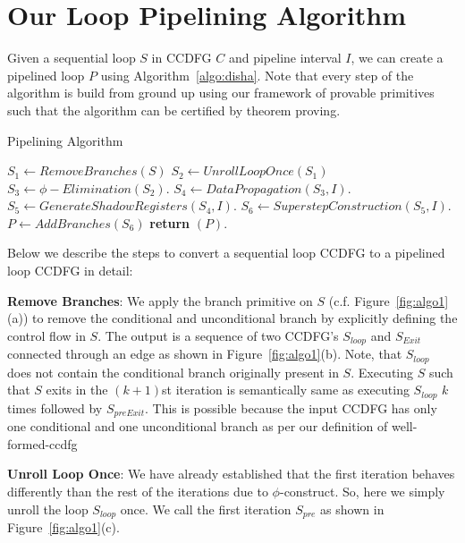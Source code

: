\section{Our Loop Pipelining Algorithm}
Given a sequential loop $S$ in CCDFG $C$ and pipeline interval $I$, we can create a pipelined loop $P$ using Algorithm~\ref{algo:disha}. Note that every step of the algorithm is build from ground up using our framework of provable primitives such that the algorithm can be certified by theorem proving.

\begin{algorithm2e}
\caption{Pipelining Algorithm}
\label{algo:loop}
\begin{algorithmic}[1]
\State $S_1 \leftarrow RemoveBranches(S)$
\State $S_2 \leftarrow UnrollLoopOnce(S_1)$
\State $S_3 \leftarrow \phi-Elimination (S_2) $.
\State $S_4 \leftarrow DataPropagation (S_3, I) $.
\State $S_5 \leftarrow GenerateShadowRegisters (S_4, I) $.
\State $ S_6 \leftarrow SuperstepConstruction (S_5, I) $.
\State $P \leftarrow AddBranches (S_6) $
\State \textbf{return} $(P)$.
\EndProcedure
\end{algorithmic}
\end{algorithm2e}

Below we describe the steps to convert a sequential loop CCDFG to a pipelined loop CCDFG in detail:
 
{\bf Remove Branches}: We apply the branch primitive on $S$ (c.f. Figure~\ref{fig:algo1}(a)) to remove the conditional and unconditional branch by explicitly defining the control flow in $S$. The output is a sequence of two CCDFG's $S_{loop}$ and $S_{Exit}$ connected through an edge as shown in Figure~\ref{fig:algo1}(b).
Note, that $S_{loop}$ does not contain the conditional branch originally present in $S$.
Executing $S$ such that $S$ exits in the $(k+1)$st iteration is semantically same as executing $S_{loop}$ $k$ times
followed by $S_{preExit}$. This is possible because the input CCDFG has only one conditional and one unconditional branch as per our definition of well-formed-ccdfg 

{\bf Unroll Loop Once}: We have already established that the first iteration behaves differently than the rest of the
iterations due to $\phi$-construct. So, here we simply unroll the loop $S_{loop}$ once. We call the first iteration
$S_{pre}$ as shown in Figure~\ref{fig:algo1}(c).

